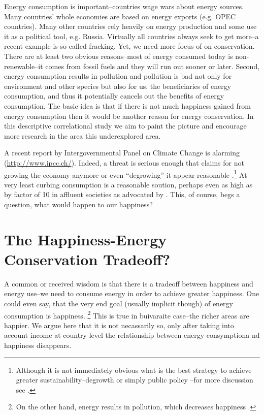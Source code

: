 \documentclass[10pt, letterpaper]{article}
\begin{document}
\begin{spacing}{1.4}
Energy consumption is important--countries wage wars about energy sources. Many
countries' whole economies are based on energy exports (e.g. OPEC
countries). Many other countries rely heavily on energy production and some use
it as a political tool, e.g. Russia. 
Virtually all countries  always seek to get more--a recent example is so called
fracking. Yet, we need more focus of on conservation. There are at least two
obvious reasons--most of energy consumed today is non-renewable--it comes from
fossil fuels and they will run out sooner or later. %
Second, energy consumption results in pollution and pollution is bad not only
for environment and other species but also for us, the beneficiaries of energy
consumption, and thus it potentially cancels out the benefits of energy
consumption. The basic idea is that if there is not much happiness gained from
energy consumption then it would be another reason for energy
conservation. 
In this descriptive correlational study we aim to paint the picture and
encourage more research in the area this underexplored area.

A recent report by
Intergovernmental Panel on Climate Change is alarming 
(\url{http://www.ipcc.ch/}). Indeed, a threat is serious enough that
claims for not growing the economy anymore or even ``degrowing'' it
appear reasonable \citep{kallis12}.\footnote{Although it is not
  immediately obvious what is the best strategy to achieve greater
  sustainability--degrowth \citep{kallis11} or simply public policy
  \citep{bergh11}--for more discussion see \citet{daly13,kallis12}.} At very
least curbing consumption is a reasonable soution, perhaps even as high as by
factor of 10 in affluent societies  as advocated by \citet{pretty13}. This,
of course, begs a question, what would happen to our happiness?


\section{The Happiness-Energy Conservation Tradeoff?}

A common or received wisdom is that there is a tradeoff between happiness and
energy use--we need to consume energy in order to achieve greater
happiness. One could even say, that the very end goal (usually implicit though)
of energy consumption is happiness. \footnote{On the other hand, energy results in pollution, which
  decreases happiness \citep[e.g]{welsch05, weinhold12}.} This is
true in buivaraite case--the richer areas are happier.
 We argue here that it is not necassarily so, only after taking into account
 income at country level %
 the relationship between energy consymptiona nd happiness disappears.


\end{spacing}
\end{document}
